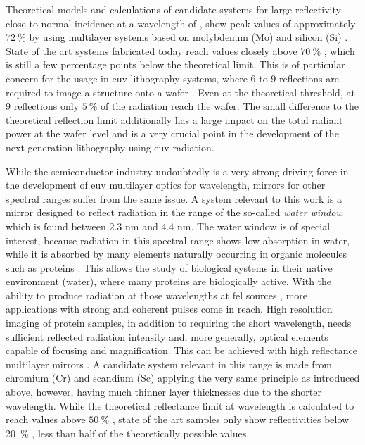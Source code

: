 Theoretical models and calculations of candidate systems for large reflectivity close to normal incidence at a wavelength of , show peak values of approximately $\SI{72}{\percent}$ by using multilayer systems based on molybdenum (Mo) and silicon (Si) \cite{barbee_jr._multi-spectral_1991,finkenthal_near_1990, barbee_molybdenum-silicon_1985}. State of the art systems fabricated today reach values closely above $\SI{70}{\percent}$ \cite{martinez-galarce_high_2000,bajt_improved_2002,braun_grenzflachen-optimierte_2003, braun_mo/si_2002, feigl_euv_2006}, which is still a few percentage points below the theoretical limit. This is of particular concern for the usage in \gls{euv} lithography systems, where $6$ to $9$ reflections are required to image a structure onto a wafer \cite{kaiser_euvl_2008, wagner_euv_2010}. Even at the theoretical threshold, at $9$ reflections only $\SI{5}{\percent}$ of the radiation reach the wafer. The small difference to the theoretical reflection limit additionally has a large impact on the total radiant power at the wafer level and is a very crucial point in the development of the next-generation lithography using \gls{euv} radiation. 

While the semiconductor industry undoubtedly is a very strong driving force in the development of \gls{euv} multilayer optics for  wavelength, mirrors for other spectral ranges suffer from the same issue. A system relevant to this work is a mirror designed to reflect radiation in the range of the so-called \emph{water window} which is found between $2.3$ nm and $4.4$ nm. The water window is of special interest, because radiation in this spectral range shows low absorption in water, while it is absorbed by many elements naturally occurring in organic molecules such as proteins \cite{kirz_soft_1995}. This allows the study of biological systems in their native environment (water), where many proteins are biologically active. With the ability to produce radiation at those wavelengths at \gls{fel} sources \cite{ackermann_operation_2007, schreiber_first_2011}, more applications with strong and coherent pulses come in reach. High resolution imaging of protein samples, in addition to requiring the short wavelength, needs sufficient reflected radiation intensity and, more generally, optical elements capable of focusing and magnification. This can be achieved with high reflectance multilayer mirrors \cite{hertz_normal-incidence_1999,legall_compact_2012}. A candidate system relevant in this range is made from chromium (Cr) and scandium (Sc) applying the very same principle as introduced above, however, having much thinner layer thicknesses due to the shorter wavelength. While the theoretical reflectance limit at  wavelength is calculated to reach values above $\SI{50}{\percent}$ \cite{schafers_cr/sc_1998}, state of the art samples only show reflectivities below \SI{20}{\percent} \cite{eriksson_14.5_2003, yulin_high-performance_2004}, less than half of the theoretically possible values.

